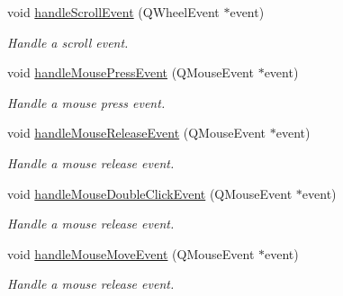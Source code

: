 \begin{Indent}
\begin{DoxyCompactItemize}
\mbox{\label{classrev_1_1_mouse_handler_a4fc7e53163e7de99846da5e6528d05bc}} 
void \mbox{\hyperlink{classrev_1_1_mouse_handler_a4fc7e53163e7de99846da5e6528d05bc}{handle\+Scroll\+Event}} (Q\+Wheel\+Event $\ast$event)
\begin{DoxyCompactList}\small\item\em Handle a scroll event. \end{DoxyCompactList}\item 
\mbox{\label{classrev_1_1_mouse_handler_a7e68c8e56e96977fd5ab256dc1620ad3}} 
void \mbox{\hyperlink{classrev_1_1_mouse_handler_a7e68c8e56e96977fd5ab256dc1620ad3}{handle\+Mouse\+Press\+Event}} (Q\+Mouse\+Event $\ast$event)
\begin{DoxyCompactList}\small\item\em Handle a mouse press event. \end{DoxyCompactList}\item 
\mbox{\label{classrev_1_1_mouse_handler_a41ddc744ebaa82da9fa7a8a307e58247}} 
void \mbox{\hyperlink{classrev_1_1_mouse_handler_a41ddc744ebaa82da9fa7a8a307e58247}{handle\+Mouse\+Release\+Event}} (Q\+Mouse\+Event $\ast$event)
\begin{DoxyCompactList}\small\item\em Handle a mouse release event. \end{DoxyCompactList}\item 
\mbox{\label{classrev_1_1_mouse_handler_adbb1d05d5fd5846de300fdee9bf8af89}} 
void \mbox{\hyperlink{classrev_1_1_mouse_handler_adbb1d05d5fd5846de300fdee9bf8af89}{handle\+Mouse\+Double\+Click\+Event}} (Q\+Mouse\+Event $\ast$event)
\begin{DoxyCompactList}\small\item\em Handle a mouse release event. \end{DoxyCompactList}\item 
\mbox{\label{classrev_1_1_mouse_handler_a8cfe0c658ec8a5b08c65d26611682eba}} 
void \mbox{\hyperlink{classrev_1_1_mouse_handler_a8cfe0c658ec8a5b08c65d26611682eba}{handle\+Mouse\+Move\+Event}} (Q\+Mouse\+Event $\ast$event)
\begin{DoxyCompactList}\small\item\em Handle a mouse release event. \end{DoxyCompactList}\item 

\end{DoxyCompactItemize}
\end{Indent}
